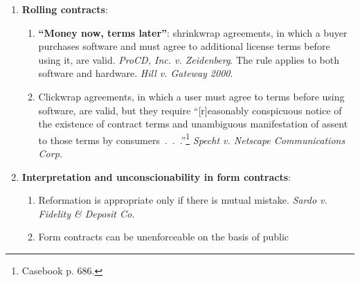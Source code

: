 \begin{enumerate}
\begin{enumerate}
\begin{enumerate}
            conditional.'' Some hold that that if acceptance is ``expressly 
            made conditional,'' it must be ``directly and distinctly 
            stated.''\footnote{Casebook p. 655.} Others apply looser 
            standards, e.g., requiring certain key phrases, or requiring the 
            offeree to demonstrate unwillingness to proceed unless he agrees 
            to the additional terms.
        \end{enumerate}
        \item \textbf{Knockout rule}: under 2-207, conflicting terms cancel 
        each other out.
        \item \textbf{``Materially alter''} under 2-207(2)(b): a term added in 
        an acceptance does not become part of the contract if it would 
        ``materially alter'' the contract. The UCC defines ``materially 
        alter'' to mean ``would result in [unreasonable] surprise or 
        hardship.'' So, for instance, a mandatory arbitration clause is not a 
        material alteration.\footnote{Casebook pp. 653--55.}
    \end{enumerate}
    \item \textbf{Rolling contracts}:
    \begin{enumerate}
        \item \textbf{``Money now, terms later''}: shrinkwrap agreements, in 
        which a buyer purchases software and must agree to additional license 
        terms before using it, are valid. \emph{ProCD, Inc. v.  Zeidenberg}. 
        The rule applies to both software and hardware.  \emph{Hill v. Gateway 
        2000}.
        \item Clickwrap agreements, in which a user must agree to terms before 
        using software, are valid, but they require ``[r]easonably conspicuous 
        notice of the existence of contract terms and unambiguous 
        manifestation of assent to those terms by 
        consumers~.~.~.''\footnote{Casebook p. 686.} \emph{Specht v. Netscape 
        Communications Corp.}
    \end{enumerate}
    \item \textbf{Interpretation and unconscionability in form contracts}:
    \begin{enumerate}
        \item Reformation is appropriate only if there is mutual mistake. 
        \emph{Sardo v. Fidelity \& Deposit Co.}
        \item Form contracts can be unenforceable on the basis of public 

\end{enumerate}
\end{enumerate}
